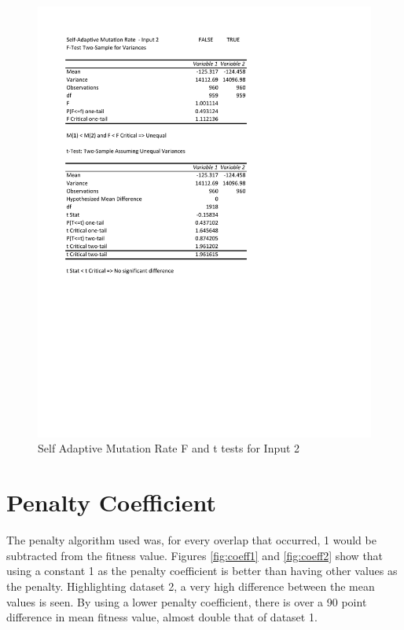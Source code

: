 \documentclass[times]{article}
\begin{document}
	\begin{figure}
		\caption{Self Adaptive Mutation Rate F and t tests for Input 2}
		\label{fig:saMutation2}
		\includegraphics[width=\textwidth]{./t_test/S-AMutationRate2}
	\end{figure}


	\section{Penalty Coefficient}
	The penalty algorithm used was, for every overlap that occurred, 1 would be subtracted from the fitness value. Figures \ref{fig:coeff1} and \ref{fig:coeff2} show that using a constant 1 as the penalty coefficient is better than having other values as the penalty. Highlighting dataset 2, a very high difference between the mean values is seen. By using a lower penalty coefficient, there is over a 90 point difference in mean fitness value, almost double that of dataset 1.
\end{document}
